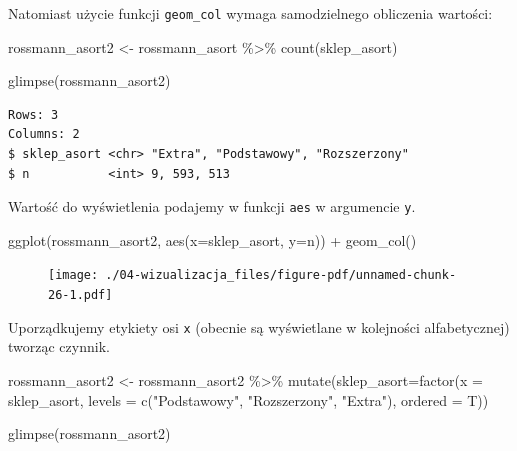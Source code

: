 \documentclass[
  letterpaper,
  DIV=11,
  numbers=noendperiod]{scrreprt}
\newenvironment{Shaded}{\begin{snugshade}}{\end{snugshade}}
\newcommand{\AttributeTok}[1]{\textcolor[rgb]{0.40,0.45,0.13}{#1}}
\newcommand{\FunctionTok}[1]{\textcolor[rgb]{0.28,0.35,0.67}{#1}}
\newcommand{\NormalTok}[1]{\textcolor[rgb]{0.00,0.23,0.31}{#1}}
\newcommand{\OtherTok}[1]{\textcolor[rgb]{0.00,0.23,0.31}{#1}}
\newcommand{\SpecialCharTok}[1]{\textcolor[rgb]{0.37,0.37,0.37}{#1}}
\newcommand{\StringTok}[1]{\textcolor[rgb]{0.13,0.47,0.30}{#1}}
\begin{document}
Natomiast użycie funkcji \texttt{geom\_col} wymaga samodzielnego
obliczenia wartości:

\begin{Shaded}
\begin{Highlighting}[]
\NormalTok{rossmann\_asort2 }\OtherTok{\textless{}{-}}\NormalTok{ rossmann\_asort }\SpecialCharTok{\%\textgreater{}\%}
  \FunctionTok{count}\NormalTok{(sklep\_asort)}

\FunctionTok{glimpse}\NormalTok{(rossmann\_asort2)}
\end{Highlighting}
\end{Shaded}

\begin{verbatim}
Rows: 3
Columns: 2
$ sklep_asort <chr> "Extra", "Podstawowy", "Rozszerzony"
$ n           <int> 9, 593, 513
\end{verbatim}

Wartość do wyświetlenia podajemy w funkcji \texttt{aes} w argumencie
\texttt{y}.

\begin{Shaded}
\begin{Highlighting}[]
\FunctionTok{ggplot}\NormalTok{(rossmann\_asort2, }\FunctionTok{aes}\NormalTok{(}\AttributeTok{x=}\NormalTok{sklep\_asort, }\AttributeTok{y=}\NormalTok{n)) }\SpecialCharTok{+}
  \FunctionTok{geom\_col}\NormalTok{()}
\end{Highlighting}
\end{Shaded}

\begin{figure}[H]

{\centering \texttt{[image: ./04-wizualizacja\_files/figure-pdf/unnamed-chunk-26-1.pdf]}

}

\end{figure}

Uporządkujemy etykiety osi \texttt{x} (obecnie są wyświetlane w
kolejności alfabetycznej) tworząc czynnik.

\begin{Shaded}
\begin{Highlighting}[]
\NormalTok{rossmann\_asort2 }\OtherTok{\textless{}{-}}\NormalTok{ rossmann\_asort2 }\SpecialCharTok{\%\textgreater{}\%}
  \FunctionTok{mutate}\NormalTok{(}\AttributeTok{sklep\_asort=}\FunctionTok{factor}\NormalTok{(}\AttributeTok{x =}\NormalTok{ sklep\_asort,}
                            \AttributeTok{levels =} \FunctionTok{c}\NormalTok{(}\StringTok{"Podstawowy"}\NormalTok{, }
                                       \StringTok{"Rozszerzony"}\NormalTok{, }
                                       \StringTok{"Extra"}\NormalTok{), }
                            \AttributeTok{ordered =}\NormalTok{ T))}

\FunctionTok{glimpse}\NormalTok{(rossmann\_asort2)}
\end{Highlighting}
\end{Shaded}
\end{document}
